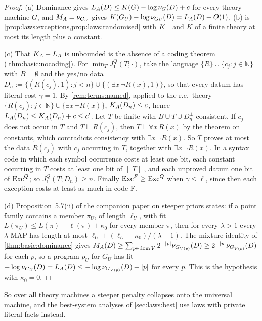 \begin{proof}
(a) Dominance gives $L_{A}(D)\le K(G)-\log\nu_G(D)+c$ for every theory machine $G$, and $M_{A}=\nu_{G_U}$ gives $K(G_U)-\log\nu_{G_U}(D)=L_{A}(D)+O(1)$. (b) is \cref{prop:laws:exceptions,prop:laws:randomised} with $K_{\equiv}$ and $K$ of a finite theory at most its length plus a constant.

(c) That $K_{A}-L_{A}$ is unbounded is the absence of a coding theorem (\cref{thm:basic:nocoding}). For $\min_TJ^Q_1(T;\cdot)$, take the language $\{R\}\cup\{c_j:j\in\mathbb N\}$ with $B=\emptyset$ and the yes/no data $D_n:=\{(R(c_j),1):j<n\}\cup\{(\exists x\,\neg R(x),1)\}$, so that every datum has literal cost $\gamma=1$. By \cref{rem:terms:named}, applied to the r.e.\ theory $\{R(c_j):j\in\mathbb N\}\cup\{\exists x\,\neg R(x)\}$, $K_{A}(D_n)\le c$, hence $L_{A}(D_n)\le K_{A}(D_n)+c\le c'$. Let $T$ be finite with $B\cup T\cup D_n^\pm$ consistent. If $c_j$ does not occur in $T$ and $T\vdash R(c_j)$, then $T\vdash\forall x\,R(x)$ by the theorem on constants, which contradicts consistency with $\exists x\,\neg R(x)$. So $T$ proves at most the data $R(c_j)$ with $c_j$ occurring in $T$, together with $\exists x\,\neg R(x)$. In a syntax code in which each symbol occurrence costs at least one bit, each constant occurring in $T$ costs at least one bit of $\lVert T\rVert$, and each unproved datum one bit of $\mathrm{Exc}^Q$; so $J^Q_1(T;D_n)\ge n$. Finally $\mathrm{Exc}^F\ge\mathrm{Exc}^Q$ when $\gamma\le\ell$, since then each exception costs at least as much in code F.

(d) Proposition~5.7(ii) of the companion paper on steeper priors \citep{claudeSFI2026steeper} states: if a point family contains a member $\pi_U$, of length $\ell_U$, with fit $L(\pi_U)\le L(\pi)+\ell(\pi)+\kappa_0$ for every member $\pi$, then for every $\lambda>1$ every $\lambda$-MAP has length at most $\ell_U+(\ell_U+\kappa_0)/(\lambda-1)$. The mixture identity of \cref{thm:basic:dominance} gives $M_{A}(D)\ge\sum_{p\in\operatorname{dom} V}2^{-\lvert p\rvert}\nu_{G_{V(p)}}(D)\ge2^{-\lvert p\rvert}\nu_{G_{V(p)}}(D)$ for each $p$, so a program $p_U$ for $G_U$ has fit $-\log\nu_{G_U}(D)=L_{A}(D)\le-\log\nu_{G_{V(p)}}(D)+\lvert p\rvert$ for every $p$. This is the hypothesis with $\kappa_0=0$.
\end{proof}

So over all theory machines a steeper penalty collapses onto the universal machine, and the best-system analyses of \cref{sec:laws:best} use laws with private literal facts instead.

